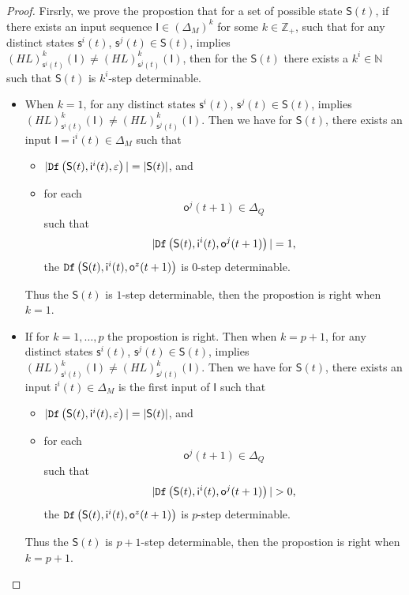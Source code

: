 \begin{proof}
Firsrly, we prove the propostion that for a set of possible state $\mathsf{S}(t)$, if there exists an input sequence $\mathsf{I}\in(\Delta_M)^k$ for some $k\in \mathbb{Z}_+$, such that for any distinct states $\mathsf{s}^{i}(t)$, $\mathsf{s}^{j}(t) \in \mathsf{S}(t)$, implies $(HL)^k_{\mathsf{s}^{i}(t)}(\mathsf{I})\neq (HL)^k_{\mathsf{s}^{j}(t)}(\mathsf{I})$, then for the $\mathsf{S}(t)$ there exists a $k^{i}\in \mathbb{N}$ such that $\mathsf{S}(t)$ is $k^{i}$-step determinable.


\begin{itemize}
\item When $k=1$, for any distinct states $\mathsf{s}^{i}(t)$, $\mathsf{s}^{j}(t) \in \mathsf{S}(t)$, implies $(HL)^k_{\mathsf{s}^{i}(t)}(\mathsf{I})\neq (HL)^k_{\mathsf{s}^{j}(t)}(\mathsf{I})$. Then we have for $\mathsf{S}(t)$,
 there exists an input $\mathsf{I}=\mathsf{i}^{i}(t) \in \Delta_M$ such that
 \begin{itemize}
 \item  $|{\tt Df}\left(\mathsf{S}(t),\mathsf{i}^{i}(t),\varepsilon\right)|=|\mathsf{S}(t)|$, and 
 \item  for each \[\mathsf{o}^{j}(t+1)\in \Delta_Q\] such that \[|{\tt Df}\left(\mathsf{S}(t),\mathsf{i}^{i}(t),\mathsf{o}^{j}(t+1)\right)|=1,\] the ${\tt Df}\left(\mathsf{S}(t),\mathsf{i}^{i}(t),\mathsf{o}^{z}(t+1)\right)$ is $0$-step determinable.
 \end{itemize}
Thus the $\mathsf{S}(t)$ is $1$-step determinable, then the propostion is right when $k=1$.

\item If for $k=1,\ldots, p$ the propostion is right. Then when $k=p+1$, for any distinct states $\mathsf{s}^{i}(t)$, $\mathsf{s}^{j}(t) \in \mathsf{S}(t)$, implies $(HL)^k_{\mathsf{s}^{i}(t)}(\mathsf{I})\neq (HL)^k_{\mathsf{s}^{j}(t)}(\mathsf{I})$. Then we have for $\mathsf{S}(t)$,
 there exists an input $\mathsf{i}^{i}(t) \in \Delta_M$ is the first input of $\mathsf{I}$ such that
 \begin{itemize}
\item  $|{\tt Df}\left(\mathsf{S}(t),\mathsf{i}^{i}(t),\varepsilon\right)|=|\mathsf{S}(t)|$, and 
 \item  for each \[\mathsf{o}^{j}(t+1)\in \Delta_Q\] such that \[|\Ded\left(\mathsf{S}(t),\mathsf{i}^{i}(t),\mathsf{o}^{j}(t+1)\right)|>0,\]  the ${\tt Df}\left(\mathsf{S}(t),\mathsf{i}^{i}(t),\mathsf{o}^{z}(t+1)\right)$ is $p$-step determinable.
 \end{itemize}
Thus the $\mathsf{S}(t)$ is $p+1$-step determinable, then the propostion is right when $k=p+1$.


\end{itemize}
\end{proof}
